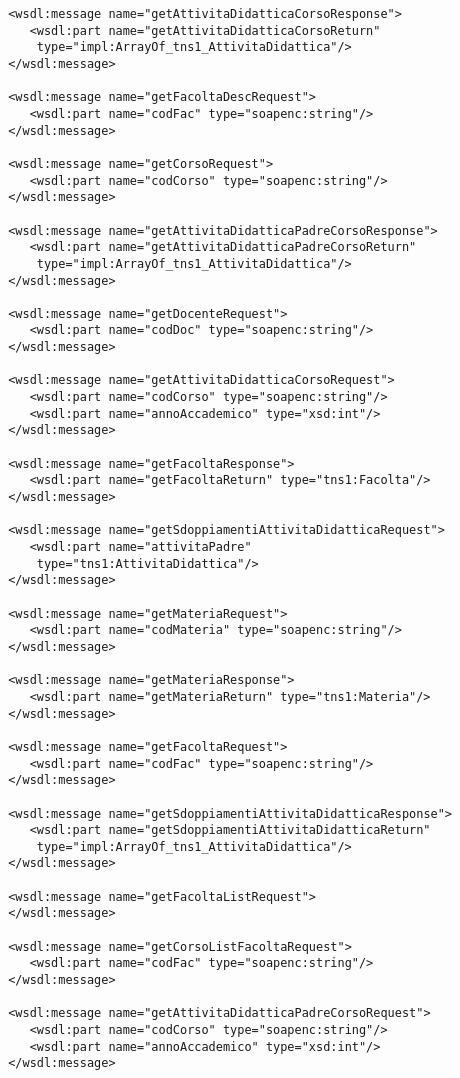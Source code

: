 \begin{small}
\begin{verbatim}
 <wsdl:message name="getAttivitaDidatticaCorsoResponse">
    <wsdl:part name="getAttivitaDidatticaCorsoReturn"
     type="impl:ArrayOf_tns1_AttivitaDidattica"/>
 </wsdl:message>

 <wsdl:message name="getFacoltaDescRequest">
    <wsdl:part name="codFac" type="soapenc:string"/>
 </wsdl:message>

 <wsdl:message name="getCorsoRequest">
    <wsdl:part name="codCorso" type="soapenc:string"/>
 </wsdl:message>

 <wsdl:message name="getAttivitaDidatticaPadreCorsoResponse">
    <wsdl:part name="getAttivitaDidatticaPadreCorsoReturn"
     type="impl:ArrayOf_tns1_AttivitaDidattica"/>
 </wsdl:message>

 <wsdl:message name="getDocenteRequest">
    <wsdl:part name="codDoc" type="soapenc:string"/>
 </wsdl:message>

 <wsdl:message name="getAttivitaDidatticaCorsoRequest">
    <wsdl:part name="codCorso" type="soapenc:string"/>
    <wsdl:part name="annoAccademico" type="xsd:int"/>
 </wsdl:message>

 <wsdl:message name="getFacoltaResponse">
    <wsdl:part name="getFacoltaReturn" type="tns1:Facolta"/>
 </wsdl:message>

 <wsdl:message name="getSdoppiamentiAttivitaDidatticaRequest">
    <wsdl:part name="attivitaPadre"
     type="tns1:AttivitaDidattica"/>
 </wsdl:message>

 <wsdl:message name="getMateriaRequest">
    <wsdl:part name="codMateria" type="soapenc:string"/>
 </wsdl:message>

 <wsdl:message name="getMateriaResponse">
    <wsdl:part name="getMateriaReturn" type="tns1:Materia"/>
 </wsdl:message>

 <wsdl:message name="getFacoltaRequest">
    <wsdl:part name="codFac" type="soapenc:string"/>
 </wsdl:message>

 <wsdl:message name="getSdoppiamentiAttivitaDidatticaResponse">
    <wsdl:part name="getSdoppiamentiAttivitaDidatticaReturn"
     type="impl:ArrayOf_tns1_AttivitaDidattica"/>
 </wsdl:message>

 <wsdl:message name="getFacoltaListRequest">
 </wsdl:message>

 <wsdl:message name="getCorsoListFacoltaRequest">
    <wsdl:part name="codFac" type="soapenc:string"/>
 </wsdl:message>

 <wsdl:message name="getAttivitaDidatticaPadreCorsoRequest">
    <wsdl:part name="codCorso" type="soapenc:string"/>
    <wsdl:part name="annoAccademico" type="xsd:int"/>
 </wsdl:message>


\end{verbatim}
\end{small}
